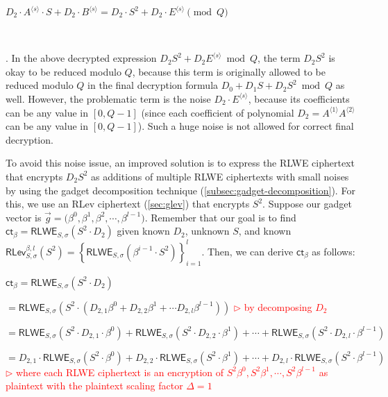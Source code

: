 $D_2\cdot A^{\langle s \rangle} \cdot S + D_2\cdot B^{\langle s \rangle} = D_2 \cdot S^2 + D_2\cdot E^{\langle s \rangle} \pmod Q$ 

$ $

. In the above decrypted expression $D_2S^2 + D_2E^{\langle s \rangle} \bmod Q$, the term $D_2S^2$ is okay to be reduced modulo $Q$, because this term is originally allowed to be reduced modulo $Q$ in the final decryption formula $D_0 + D_1S + D_2S^2 \bmod Q$ as well. However, the problematic term is the noise $D_2\cdot E^{\langle s \rangle}$, because its coefficients can be any value in $[0, Q - 1]$ (since each coefficient of polynomial $D_2 = A^{\langle 1 \rangle} A^{\langle 2 \rangle}$ can be any value in $[0, Q - 1]$). Such a huge noise is not allowed for correct final decryption. 

To avoid this noise issue, an improved solution is to express the RLWE ciphertext that encrypts $D_2 S^2$ as additions of multiple RLWE ciphertexts with small noises by using the gadget decomposition technique (\autoref{subsec:gadget-decomposition}). For this, we use an RLev ciphertext (\autoref{sec:glev}) that encrypts $S^2$. Suppose our gadget vector is $\vec{g} = \Bigg(\beta^{0}, \beta^{1}, \beta^{2}, \cdots, \beta^{l-1}\Bigg)$. Remember that our goal is to find $\textsf{ct}_\beta = \textsf{RLWE}_{S, \sigma}( S^2 \cdot D_2)$ given known $D_2$, unknown $S$, and known $\textsf{RLev}_{S, \sigma}^{\beta, l}(S^2) = \left\{\textsf{RLWE}_{S, \sigma}\left(\beta^{i-1}\cdot S^2\right)\right\}_{i=1}^{l}$. Then, we can derive $\textsf{ct}_\beta$ as follows:

$\textsf{ct}_\beta = \textsf{RLWE}_{S, \sigma}(S^2 \cdot D_2)$

$= \textsf{RLWE}_{S, \sigma}\left( S^2 \cdot \left(D_{2,1}\beta^{0} + D_{2,2}\beta^{1} + \cdots D_{2,l}\beta^{l-1}\right)\right)$ \textcolor{red}{  $\rhd$ by decomposing $D_2$}

$= \textsf{RLWE}_{S, \sigma}\left( S^2 \cdot D_{2,1} \cdot \beta^{0}\right) + \textsf{RLWE}_{S, \sigma}\left( S^2 \cdot D_{2,2} \cdot \beta^{1}\right) + \cdots + \textsf{RLWE}_{S, \sigma}\left( S^2 \cdot D_{2,l} \cdot \beta^{l-1}\right)$

$= D_{2,1}\cdot\textsf{RLWE}_{S, \sigma}\left( S^2 \cdot \beta^{0}\right) + D_{2,2}\cdot\textsf{RLWE}_{S, \sigma}\left( S^2 \cdot \beta^{1}\right) + \cdots + D_{2,l}\cdot\textsf{RLWE}_{S, \sigma}\left( S^2 \cdot \beta^{l-1}\right)$
\textcolor{red}{ $\rhd$ where each \textsf{RLWE} ciphertext is an encryption of $S^2\beta^{0}, S^2\beta^{1}, \cdots, S^2\beta^{l-1}$ as plaintext with the plaintext scaling factor $\Delta = 1$}

